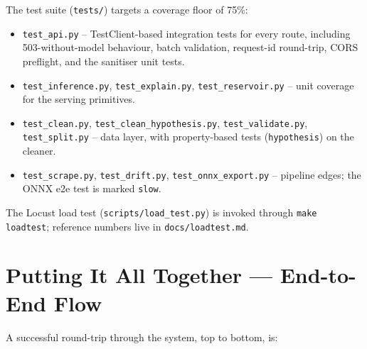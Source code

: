 \documentclass[11pt,a4paper]{article}
\begin{document}
The test suite (\texttt{tests/}) targets a coverage floor of 75\%:

\begin{itemize}[leftmargin=*]
\item \texttt{test\_api.py} -- TestClient-based integration tests for every route,
      including 503-without-model behaviour, batch validation, request-id
      round-trip, CORS preflight, and the sanitiser unit tests.
\item \texttt{test\_inference.py}, \texttt{test\_explain.py}, \texttt{test\_reservoir.py}
      -- unit coverage for the serving primitives.
\item \texttt{test\_clean.py}, \texttt{test\_clean\_hypothesis.py},
      \texttt{test\_validate.py}, \texttt{test\_split.py} -- data layer, with
      property-based tests (\texttt{hypothesis}) on the cleaner.
\item \texttt{test\_scrape.py}, \texttt{test\_drift.py}, \texttt{test\_onnx\_export.py}
      -- pipeline edges; the ONNX e2e test is marked \texttt{slow}.
\end{itemize}

\noindent The Locust load test (\texttt{scripts/load\_test.py}) is invoked through
\texttt{make loadtest}; reference numbers live in \texttt{docs/loadtest.md}.

\section{Putting It All Together --- End-to-End Flow}

A successful round-trip through the system, top to bottom, is:
\end{document}
